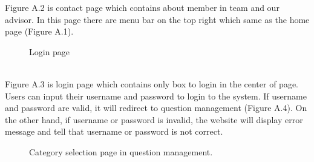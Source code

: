 \documentclass[12pt,oneside,openright,a4paper]{cpe-english-project}
\begin{document}
Figure A.2 is contact page which contains about member in team and our advisor. In 
this page there are menu bar on the top right which same as the home page (Figure A.1).\\
\begin{figure}[!h]\centering
{}
\caption{Login page}\label{fig:Login page}
\end{figure}\\
Figure A.3 is login page which contains only box to login in the center of page. Users 
can input their username and password to login to the system. If username and password are 
valid, it will redirect to question management (Figure A.4). On the other hand, if username 
or password is invalid, the website will display error message and tell that username or 
password is not correct.
\begin{figure}[!h]\centering
{}
\caption{Category selection page in question management.
}\label{fig:Category selection page in question management.
}
\end{figure}\\
\end{document}
